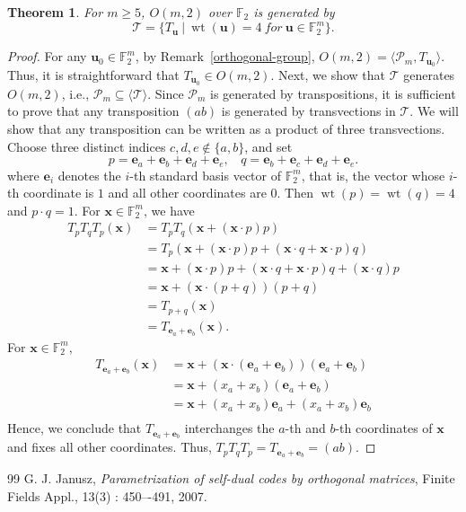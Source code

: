 \documentclass[10pt,a4paper]{amsart}
\newtheorem{theorem}{Theorem}
\newcommand{\wt}{\operatorname{wt}}
\begin{document}
\begin{theorem}\label{orthogonal-group-generator}
    For $m \geq 5$, $O(m,2)$ over $\mathbb{F}_2$ is generated by \[
    \mathcal{T} = \{T_\mathbf{u}~|~\wt(\mathbf{u})=4~for~\mathbf{u}\in\mathbb{F}_2^m\}.
    \]
\end{theorem}

\begin{proof}
    For any $\mathbf{u}_0 \in \mathbb{F}_2^m$, by Remark~\ref{orthogonal-group}, $O(m,2)=\langle\mathcal{P}_m, T_{\mathbf{u}_0}\rangle$. Thus, it is straightforward that $T_{\mathbf{u}_0} \in O(m,2)$.
    Next, we show that $\mathcal{T}$ generates $O(m,2)$, i.e., $\mathcal{P}_m \subseteq \langle\mathcal{T}\rangle$. Since $\mathcal{P}_m$ is generated by transpositions, it is sufficient to prove that any transposition $(ab)$ is generated by transvections in $\mathcal{T}$. We will show that any transposition can be written as a product of three transvections. Choose three distinct indices $c, d, e \notin \{a, b\}$, and set\[
    p=\mathbf{e}_a + \mathbf{e}_b + \mathbf{e}_d + \mathbf{e}_e,~~~~q=\mathbf{e}_b + \mathbf{e}_c + \mathbf{e}_d + \mathbf{e}_e.
    \] where $\mathbf{e}_i$ denotes the $i$-th standard basis vector of $\mathbb{F}_2^m$, that is, the vector whose $i$-th coordinate is $1$ and all other coordinates are $0$.
    Then $\wt(p)=\wt(q)=4$ and $p \cdot q = 1$. For $\mathbf{x} \in \mathbb{F}_2^m$, we have
\begin{align*}
    T_p T_q T_p(\mathbf{x}) &= T_p T_q(\mathbf{x} + (\mathbf{x} \cdot p)p)\\
    &= T_p (\mathbf{x} + (\mathbf{x} \cdot p)p + (\mathbf{x} \cdot q + \mathbf{x} \cdot p)q)\\
    &= \mathbf{x} + (\mathbf{x} \cdot p)p + (\mathbf{x} \cdot q + \mathbf{x} \cdot p)q + (\mathbf{x} \cdot q)p\\
    &= \mathbf{x} + (\mathbf{x} \cdot (p+q))(p+q)\\
    &= T_{p+q}(\mathbf{x})\\
    &= T_{\mathbf{e}_a+\mathbf{e}_b}(\mathbf{x}).
\end{align*}
For $\mathbf{x} \in \mathbb{F}_2^m$,
\begin{align*}
    T_{\mathbf{e}_a+\mathbf{e}_b}(\mathbf{x})&=\mathbf{x} + (\mathbf{x} \cdot (\mathbf{e}_a+\mathbf{e}_b))(\mathbf{e}_a+\mathbf{e}_b)\\
    &=\mathbf{x} + (x_a+x_b)(\mathbf{e}_a+\mathbf{e}_b)\\
    &=\mathbf{x} + (x_a+x_b)\mathbf{e}_a + (x_a+x_b)\mathbf{e}_b\\
\end{align*}
Hence, we conclude that $T_{\mathbf{e}_a+\mathbf{e}_b}$ interchanges the $a$-th and $b$-th coordinates of $\mathbf{x}$ and fixes all other coordinates.
Thus, $T_p T_q T_p = T_{\mathbf{e}_a+\mathbf{e}_b} = (ab)$.
\end{proof}

\begin{thebibliography}{99}
 G. J. Janusz, \emph{Parametrization of self-dual codes by orthogonal matrices}, Finite Fields Appl., 13(3) : 450–-491, 2007.
\end{thebibliography}
\end{document}
